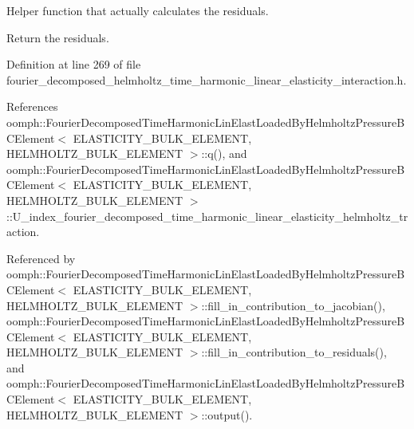 Helper function that actually calculates the residuals. 

Return the residuals. 

Definition at line 269 of file fourier\+\_\+decomposed\+\_\+helmholtz\+\_\+time\+\_\+harmonic\+\_\+linear\+\_\+elasticity\+\_\+interaction.\+h.



References oomph\+::\+Fourier\+Decomposed\+Time\+Harmonic\+Lin\+Elast\+Loaded\+By\+Helmholtz\+Pressure\+B\+C\+Element$<$ E\+L\+A\+S\+T\+I\+C\+I\+T\+Y\+\_\+\+B\+U\+L\+K\+\_\+\+E\+L\+E\+M\+E\+N\+T, H\+E\+L\+M\+H\+O\+L\+T\+Z\+\_\+\+B\+U\+L\+K\+\_\+\+E\+L\+E\+M\+E\+N\+T $>$\+::q(), and oomph\+::\+Fourier\+Decomposed\+Time\+Harmonic\+Lin\+Elast\+Loaded\+By\+Helmholtz\+Pressure\+B\+C\+Element$<$ E\+L\+A\+S\+T\+I\+C\+I\+T\+Y\+\_\+\+B\+U\+L\+K\+\_\+\+E\+L\+E\+M\+E\+N\+T, H\+E\+L\+M\+H\+O\+L\+T\+Z\+\_\+\+B\+U\+L\+K\+\_\+\+E\+L\+E\+M\+E\+N\+T $>$\+::\+U\+\_\+index\+\_\+fourier\+\_\+decomposed\+\_\+time\+\_\+harmonic\+\_\+linear\+\_\+elasticity\+\_\+helmholtz\+\_\+traction.



Referenced by oomph\+::\+Fourier\+Decomposed\+Time\+Harmonic\+Lin\+Elast\+Loaded\+By\+Helmholtz\+Pressure\+B\+C\+Element$<$ E\+L\+A\+S\+T\+I\+C\+I\+T\+Y\+\_\+\+B\+U\+L\+K\+\_\+\+E\+L\+E\+M\+E\+N\+T, H\+E\+L\+M\+H\+O\+L\+T\+Z\+\_\+\+B\+U\+L\+K\+\_\+\+E\+L\+E\+M\+E\+N\+T $>$\+::fill\+\_\+in\+\_\+contribution\+\_\+to\+\_\+jacobian(), oomph\+::\+Fourier\+Decomposed\+Time\+Harmonic\+Lin\+Elast\+Loaded\+By\+Helmholtz\+Pressure\+B\+C\+Element$<$ E\+L\+A\+S\+T\+I\+C\+I\+T\+Y\+\_\+\+B\+U\+L\+K\+\_\+\+E\+L\+E\+M\+E\+N\+T, H\+E\+L\+M\+H\+O\+L\+T\+Z\+\_\+\+B\+U\+L\+K\+\_\+\+E\+L\+E\+M\+E\+N\+T $>$\+::fill\+\_\+in\+\_\+contribution\+\_\+to\+\_\+residuals(), and oomph\+::\+Fourier\+Decomposed\+Time\+Harmonic\+Lin\+Elast\+Loaded\+By\+Helmholtz\+Pressure\+B\+C\+Element$<$ E\+L\+A\+S\+T\+I\+C\+I\+T\+Y\+\_\+\+B\+U\+L\+K\+\_\+\+E\+L\+E\+M\+E\+N\+T, H\+E\+L\+M\+H\+O\+L\+T\+Z\+\_\+\+B\+U\+L\+K\+\_\+\+E\+L\+E\+M\+E\+N\+T $>$\+::output().

\mbox{\label{classoomph_1_1FourierDecomposedTimeHarmonicLinElastLoadedByHelmholtzPressureBCElement_af1db6d117e79ceb536932adf64ea4752}} 
